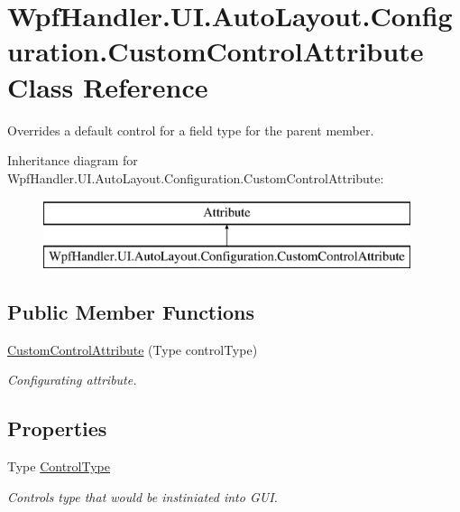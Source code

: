 \hypertarget{class_wpf_handler_1_1_u_i_1_1_auto_layout_1_1_configuration_1_1_custom_control_attribute}{}\section{Wpf\+Handler.\+U\+I.\+Auto\+Layout.\+Configuration.\+Custom\+Control\+Attribute Class Reference}
\label{class_wpf_handler_1_1_u_i_1_1_auto_layout_1_1_configuration_1_1_custom_control_attribute}


Overrides a default control for a field type for the parent member.  


Inheritance diagram for Wpf\+Handler.\+U\+I.\+Auto\+Layout.\+Configuration.\+Custom\+Control\+Attribute\+:\begin{figure}[H]
\begin{center}
\leavevmode
\includegraphics[height=2.000000cm]{d1/de8/class_wpf_handler_1_1_u_i_1_1_auto_layout_1_1_configuration_1_1_custom_control_attribute}
\end{center}
\end{figure}
\subsection*{Public Member Functions}
\begin{DoxyCompactItemize}
\item 
\mbox{\hyperlink{class_wpf_handler_1_1_u_i_1_1_auto_layout_1_1_configuration_1_1_custom_control_attribute_a7a46691a6fae1c36fb9812923e90cf8a}{Custom\+Control\+Attribute}} (Type control\+Type)
\begin{DoxyCompactList}\small\item\em Configurating attribute. \end{DoxyCompactList}\end{DoxyCompactItemize}
\subsection*{Properties}
\begin{DoxyCompactItemize}
\item 
Type \mbox{\hyperlink{class_wpf_handler_1_1_u_i_1_1_auto_layout_1_1_configuration_1_1_custom_control_attribute_a71f151123c78381231004ac155570be0}{Control\+Type}}
\begin{DoxyCompactList}\small\item\em Control\textquotesingle{}s type that would be instiniated into G\+UI. \end{DoxyCompactList}\end{DoxyCompactItemize}
